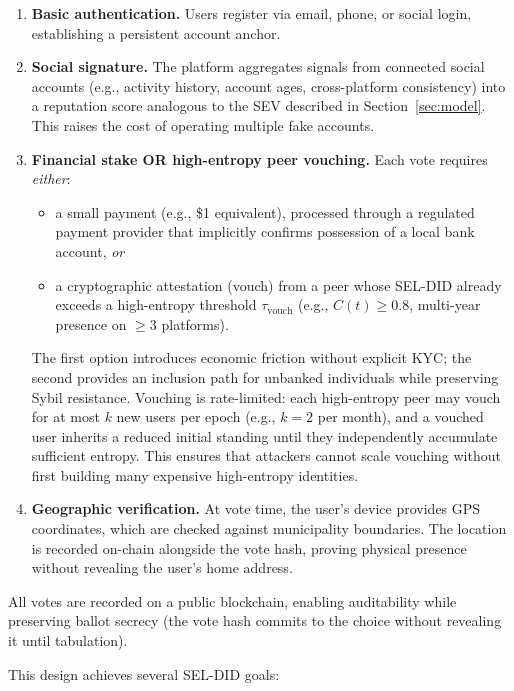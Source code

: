 \documentclass[11pt]{article}
\begin{document}
\begin{enumerate}
  \item \textbf{Basic authentication.} Users register via email, phone, or social login, establishing a persistent account anchor.
  \item \textbf{Social signature.} The platform aggregates signals from connected social accounts (e.g., activity history, account ages, cross-platform consistency) into a reputation score analogous to the SEV described in Section~\ref{sec:model}. This raises the cost of operating multiple fake accounts.
  \item \textbf{Financial stake OR high-entropy peer vouching.} Each vote requires \emph{either}:
  \begin{itemize}
    \item a small payment (e.g., \$1 equivalent), processed through a regulated payment provider that implicitly confirms possession of a local bank account, \emph{or}
    \item a cryptographic attestation (vouch) from a peer whose SEL-DID already exceeds a high-entropy threshold $\tau_{\text{vouch}}$ (e.g., $C(t) \geq 0.8$, multi-year presence on $\geq 3$ platforms).
  \end{itemize}
  The first option introduces economic friction without explicit KYC; the second provides an inclusion path for unbanked individuals while preserving Sybil resistance. Vouching is rate-limited: each high-entropy peer may vouch for at most $k$ new users per epoch (e.g., $k = 2$ per month), and a vouched user inherits a reduced initial standing until they independently accumulate sufficient entropy. This ensures that attackers cannot scale vouching without first building many expensive high-entropy identities.
  \item \textbf{Geographic verification.} At vote time, the user's device provides GPS coordinates, which are checked against municipality boundaries. The location is recorded on-chain alongside the vote hash, proving physical presence without revealing the user's home address.
\end{enumerate}

All votes are recorded on a public blockchain, enabling auditability while preserving ballot secrecy (the vote hash commits to the choice without revealing it until tabulation).

This design achieves several SEL-DID goals:
\end{document}
